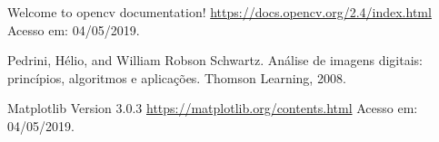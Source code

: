 \documentclass[twoside,twocolumn]{article}
\begin{document}

\begin{thebibliography}{99} %

 Welcome to opencv documentation! \href{https://docs.opencv.org/2.4/index.html}{https://docs.opencv.org/2.4/index.html} Acesso em: 04/05/2019.

 Pedrini, Hélio, and William Robson Schwartz. Análise de imagens digitais: princípios, algoritmos e aplicações. Thomson Learning, 2008.

 Matplotlib Version 3.0.3 \href{https://matplotlib.org/contents.html}{https://matplotlib.org/contents.html} Acesso em: 04/05/2019.
 
\end{thebibliography}

\end{document}
